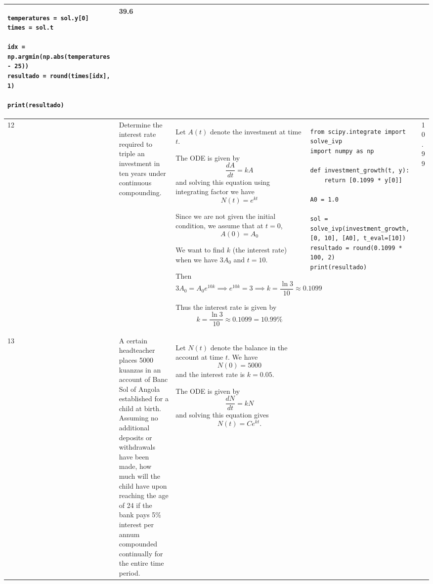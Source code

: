 \documentclass[a4paper,12pt]{article}
\begin{document}
\begin{longtable}{|p{0.3cm}|p{}|p{10cm}|p{}|p{1.5cm}|}
\begin{verbatim}
temperatures = sol.y[0]
times = sol.t

idx = np.argmin(np.abs(temperatures - 25))
resultado = round(times[idx], 1)

print(resultado)\end{verbatim}& 39.6                \\ \hline
   12              &   Determine the interest rate required to triple an investment in ten years under continuous compounding.               &                

 Let \( A(t) \) denote the investment at time \( t \).

The ODE is given by
\[
\frac{dA}{dt} = kA
\]
and solving this equation using integrating factor we have
\[
N(t) = e^{kt}
\]

Since we are not given the initial condition, we assume that at \( t = 0 \),
\[
A(0) = A_0
\]

We want to find \( k \) (the interest rate) when we have \( 3A_0 \) and \( t = 10 \).

Then
\[
3A_0 = A_0 e^{10k} \implies e^{10k} = 3 \implies k = \frac{\ln 3}{10} \approx 0.1099
\]

Thus the interest rate is given by
\[
k = \frac{\ln 3}{10} \approx 0.1099=10.99\%
\]



&\begin{verbatim}
from scipy.integrate import solve_ivp
import numpy as np

def investment_growth(t, y):
    return [0.1099 * y[0]]

A0 = 1.0

sol = solve_ivp(investment_growth, [0, 10], [A0], t_eval=[10])
resultado = round(0.1099 * 100, 2)
print(resultado)\end{verbatim} &  10.99             \\ \hline
      13           & A certain headteacher places 5000 kuanzas in an account of Banc Sol of Angola established for a child at birth. Assuming no additional deposits or withdrawals have been made, how much will the child have upon reaching the age of 24 if the bank pays 5\% interest per annum compounded continually for the entire time period.       & 

Let \( N(t) \) denote the balance in the account at time \( t \). We have
\[
N(0) = 5000
\]
and the interest rate is \( k = 0.05 \).

The ODE is given by
\[
\frac{dN}{dt} = kN
\]
and solving this equation gives
\[
N(t) = C e^{kt}.
\]


\end{longtable}
\end{document}
